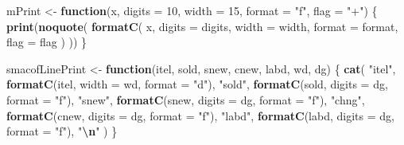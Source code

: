 \documentclass[
  12pt,
]{article}
\newenvironment{Shaded}{\begin{snugshade}}{\end{snugshade}}
\newcommand{\AttributeTok}[1]{\textcolor[rgb]{0.13,0.29,0.53}{#1}}
\newcommand{\ControlFlowTok}[1]{\textcolor[rgb]{0.13,0.29,0.53}{\textbf{#1}}}
\newcommand{\DecValTok}[1]{\textcolor[rgb]{0.00,0.00,0.81}{#1}}
\newcommand{\FunctionTok}[1]{\textcolor[rgb]{0.13,0.29,0.53}{\textbf{#1}}}
\newcommand{\NormalTok}[1]{#1}
\newcommand{\OtherTok}[1]{\textcolor[rgb]{0.56,0.35,0.01}{#1}}
\newcommand{\SpecialCharTok}[1]{\textcolor[rgb]{0.81,0.36,0.00}{\textbf{#1}}}
\newcommand{\StringTok}[1]{\textcolor[rgb]{0.31,0.60,0.02}{#1}}
\begin{document}
\begin{Shaded}
\begin{Highlighting}[]
\NormalTok{mPrint }\OtherTok{\textless{}{-}} \ControlFlowTok{function}\NormalTok{(x,}
                   \AttributeTok{digits =} \DecValTok{10}\NormalTok{,}
                   \AttributeTok{width =} \DecValTok{15}\NormalTok{,}
                   \AttributeTok{format =} \StringTok{"f"}\NormalTok{,}
                   \AttributeTok{flag =} \StringTok{"+"}\NormalTok{) \{}
  \FunctionTok{print}\NormalTok{(}\FunctionTok{noquote}\NormalTok{(}
    \FunctionTok{formatC}\NormalTok{(}
\NormalTok{      x,}
      \AttributeTok{digits =}\NormalTok{ digits,}
      \AttributeTok{width =}\NormalTok{ width,}
      \AttributeTok{format =}\NormalTok{ format,}
      \AttributeTok{flag =}\NormalTok{ flag}
\NormalTok{    )}
\NormalTok{  ))}
\NormalTok{\}}

\NormalTok{smacofLinePrint }\OtherTok{\textless{}{-}} \ControlFlowTok{function}\NormalTok{(itel, sold, snew, cnew, labd, wd, dg) \{}
  \FunctionTok{cat}\NormalTok{(}
    \StringTok{"itel"}\NormalTok{,}
    \FunctionTok{formatC}\NormalTok{(itel, }\AttributeTok{width =}\NormalTok{ wd, }\AttributeTok{format =} \StringTok{"d"}\NormalTok{),}
    \StringTok{"sold"}\NormalTok{,}
    \FunctionTok{formatC}\NormalTok{(sold, }\AttributeTok{digits =}\NormalTok{ dg, }\AttributeTok{format =} \StringTok{"f"}\NormalTok{),}
    \StringTok{"snew"}\NormalTok{,}
    \FunctionTok{formatC}\NormalTok{(snew, }\AttributeTok{digits =}\NormalTok{ dg, }\AttributeTok{format =} \StringTok{"f"}\NormalTok{),}
    \StringTok{"chng"}\NormalTok{,}
    \FunctionTok{formatC}\NormalTok{(cnew, }\AttributeTok{digits =}\NormalTok{  dg, }\AttributeTok{format =} \StringTok{"f"}\NormalTok{),}
    \StringTok{"labd"}\NormalTok{,}
    \FunctionTok{formatC}\NormalTok{(labd, }\AttributeTok{digits =}\NormalTok{  dg, }\AttributeTok{format =} \StringTok{"f"}\NormalTok{),}
    \StringTok{"}\SpecialCharTok{\textbackslash{}n}\StringTok{"}
\NormalTok{  )}
\NormalTok{\}}


\end{Highlighting}
\end{Shaded}
\end{document}

